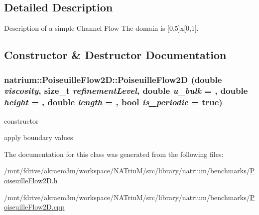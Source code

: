 \subsection{Detailed Description}
Description of a simple Channel Flow The domain is \mbox{[}0,5\mbox{]}x\mbox{[}0,1\mbox{]}. 

\subsection{Constructor \& Destructor Documentation}
\hypertarget{classnatrium_1_1PoiseuilleFlow2D_a377e6996a9b45552b9a56aa96d0325ee}{
\subsubsection[{PoiseuilleFlow2D}]{\setlength{\rightskip}{0pt plus 5cm}natrium::PoiseuilleFlow2D::PoiseuilleFlow2D (double {\em viscosity}, \/  size\_\-t {\em refinementLevel}, \/  double {\em u\_\-bulk} = {}, \/  double {\em height} = {}, \/  double {\em length} = {}, \/  bool {\em is\_\-periodic} = {\ttfamily true})}}
\label{classnatrium_1_1PoiseuilleFlow2D_a377e6996a9b45552b9a56aa96d0325ee}


constructor 

apply boundary values 

The documentation for this class was generated from the following files:\begin{DoxyCompactItemize}
\item 
/mnt/fdrive/akraem3m/workspace/NATriuM/src/library/natrium/benchmarks/\hyperlink{PoiseuilleFlow2D_8h}{PoiseuilleFlow2D.h}\item 
/mnt/fdrive/akraem3m/workspace/NATriuM/src/library/natrium/benchmarks/\hyperlink{PoiseuilleFlow2D_8cpp}{PoiseuilleFlow2D.cpp}\end{DoxyCompactItemize}
